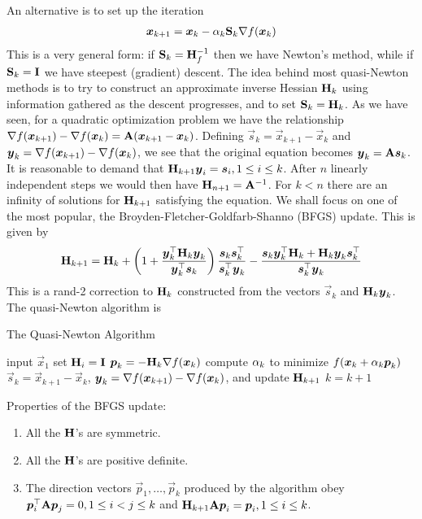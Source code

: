 An alternative is to set up the iteration
\begin{align*}
	\boldsymbol{x}_{k+1}=\boldsymbol{x}_k-\alpha_k\mathbf{S}_k\nabla f(\boldsymbol{x}_k)
\end{align*}
This is a very general form: if $\mathbf{S}_k=\mathbf{H}_f^{-1}$ then we have Newton's method, while if $\mathbf{S}_k=\mathbf{I}$ we have steepest (gradient) descent. The idea behind most quasi-Newton methods is to try to construct an approximate inverse Hessian $\mathbf{H}_k$ using information gathered as the descent progresses, and to set $\mathbf{S}_k=\mathbf{H}_k$. As we have seen, for a quadratic optimization problem we have the relationship $\nabla f(\boldsymbol{x}_{k+1})-\nabla f(\boldsymbol{x}_k)=\mathbf{A}(\boldsymbol{x}_{k+1}-\boldsymbol{x}_k)$. Defining $\vec{s}_k=\vec{x}_{k+1}-\vec{x}_k$ and $\boldsymbol{y}_k=\nabla f(\boldsymbol{x}_{k+1})-\nabla f(\boldsymbol{x}_k)$, we see that the original equation becomes $\boldsymbol{y}_k=\mathbf{A}\boldsymbol{s}_k$. It is reasonable to demand that $\mathbf{H}_{k+1}\boldsymbol{y}_i=\boldsymbol{s}_i,1\leq i\leq k$. After $n$ linearly independent steps we would then have $\mathbf{H}_{n+1}=\mathbf{A}^{-1}$. For $k<n$ there are an infinity of solutions for $\mathbf{H}_{k+1}$ satisfying the equation. We shall focus on one of the most popular, the Broyden-Fletcher-Goldfarb-Shanno (BFGS) update. This is given by
\begin{align*}
	\mathbf{H}_{k+1}=\mathbf{H}_k+\left(1+\frac{\boldsymbol{y}_k^\top\mathbf{H}_k\boldsymbol{y}_k}{\boldsymbol{y}_k^\top\boldsymbol{s}_k}\right)\frac{\boldsymbol{s}_k\boldsymbol{s}_k^\top}{\boldsymbol{s}_k^\top\boldsymbol{y}_k}-\frac{\boldsymbol{s}_k\boldsymbol{y}_k^\top\mathbf{H}_k+\mathbf{H}_k\boldsymbol{y}_k\boldsymbol{s}_k^\top}{\boldsymbol{s}_k^\top\boldsymbol{y}_k}
\end{align*}
This is a rand-2 correction to $\mathbf{H}_k$ constructed from the vectors $\vec{s}_k$ and $\mathbf{H}_k\boldsymbol{y}_k$. The quasi-Newton algorithm is
\begin{algorithm}[H]
	\caption{The Quasi-Newton Algorithm}
	\begin{algorithmic}
		\State input $\vec{x}_1$
		\State set $\mathbf{H}_i=\mathbf{I}$
			\State $\boldsymbol{p}_k=-\mathbf{H}_k\nabla f(\boldsymbol{x}_k)$
			\State compute $\alpha_k$ to minimize $f(\boldsymbol{x}_k+\alpha_k\boldsymbol{p}_k)$
			\State $\vec{s}_k=\vec{x}_{k+1}-\vec{x}_k$, $\boldsymbol{y}_k=\nabla f(\boldsymbol{x}_{k+1})-\nabla f(\boldsymbol{x}_k)$, and update $\mathbf{H}_{k+1}$
			\State $k=k+1$
		\EndFor
	\end{algorithmic}
\end{algorithm}
Properties of the BFGS update:
\begin{enumerate}
	\item All the $\mathbf{H}$'s are symmetric.
	\item All the $\mathbf{H}$'s are positive definite.
	\item The direction vectors $\vec{p}_1,\dotsc,\vec{p}_k$ produced by the algorithm obey $\boldsymbol{p}_i^\top\mathbf{A}\boldsymbol{p}_j=0,1\leq i<j\leq k$ and $\mathbf{H}_{k+1}\mathbf{A}\boldsymbol{p}_i=\boldsymbol{p}_i,1\leq i\leq k$.
\end{enumerate}

